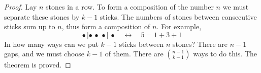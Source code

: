 

\setcounter{section}{3}
\setcounter{subsection}{5}
\setcounter{dfn}{10}

\begin{proof}
Lay $n$ stones in a row.
To form a composition of the number $n$ we must separate these stones by $k-1$ sticks.
The numbers of stones between consecutive sticks sum up to $n$, thus form a composition of $n$.
For example,
\[
\bullet\, | \bullet\, \bullet\, \bullet |\, \bullet \quad \longleftrightarrow \quad 5 = 1+3+1
\]
In how many ways can we put $k-1$ sticks between $n$ stones?
There are $n-1$ gaps, and we must choose $k-1$ of them.
There are $\binom{n-1}{k-1}$ ways to do this. The theorem is proved.
\end{proof}




